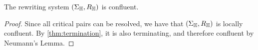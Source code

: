 \begin{thm}
  \label{thm:confluent}
  The rewriting system $(\Sigma_{\mathbb H},R_{\mathbb H})$ is confluent.
\end{thm}

\begin{proof}
  Since all critical pairs can be resolved, we have that $(\Sigma_{\mathbb H},R_{\mathbb H})$ is locally confluent. 
  By \cref{thm:termination}, it is also terminating, and therefore confluent by Neumann's Lemma.
\end{proof}



